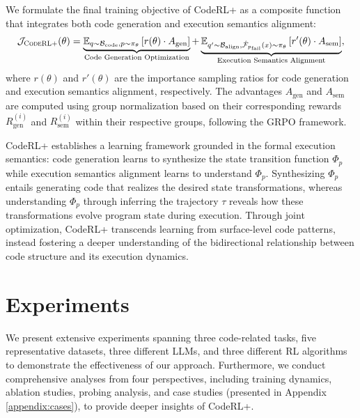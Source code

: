 \documentclass{article}
\DeclareRobustCommand{\ourapproach}{{\sc CodeRL+}\xspace}
\theoremstyle{definition}
\theoremstyle{remark}
\begin{document}
We formulate the final training objective of \ourapproach as a composite function that integrates both code generation and execution semantics alignment:
\begin{equation}
\begin{aligned}
\mathcal{J}_{\text{\ourapproach}}(\theta) = \underbrace{\mathbb{E}_{q \sim \mathcal{B}_{\text{code}}, p \sim \pi_\theta} \left[ r(\theta) \cdot A_{\text{gen}} \right]}_{\text{Code Generation Optimization}} + \underbrace{\mathbb{E}_{q' \sim \mathcal{B}_{\text{align}}, \hat{\mathcal{F}}_{p_{\text{fail}}}(x) \sim \pi_\theta} \left[ r'(\theta) \cdot A_{\text{sem}} \right]}_{\text{Execution Semantics Alignment}},
\end{aligned}
\end{equation}
where $r(\theta)$ and $r'(\theta)$ are the importance sampling ratios for code generation and execution semantics alignment, respectively. The advantages $A_{\text{gen}}$ and $A_{\text{sem}}$ are computed using group normalization based on their corresponding rewards $R_{\text{gen}}^{(i)}$ and $R_{\text{sem}}^{(i)}$ within their respective groups, following the GRPO framework. 


\ourapproach establishes a learning framework grounded in the formal execution semantics: code generation learns to synthesize the state transition function $\Phi_p$ while execution semantics alignment learns to understand $\Phi_p$. Synthesizing $\Phi_p$ entails generating code that realizes the desired state transformations, whereas understanding $\Phi_p$ through inferring the trajectory $\tau$ reveals how these transformations evolve program state during execution. Through joint optimization, \ourapproach transcends learning from surface-level code patterns, instead fostering a deeper understanding of the bidirectional relationship between code structure and its execution dynamics.


\section{Experiments}
We present extensive experiments spanning three code-related tasks, five representative datasets, three different LLMs, and three different RL algorithms to demonstrate the effectiveness of our approach. Furthermore, we conduct comprehensive analyses from four perspectives, including training dynamics, ablation studies, probing analysis, and case studies (presented in Appendix \ref{appendix:cases}), to provide deeper insights of \ourapproach.
\end{document}
